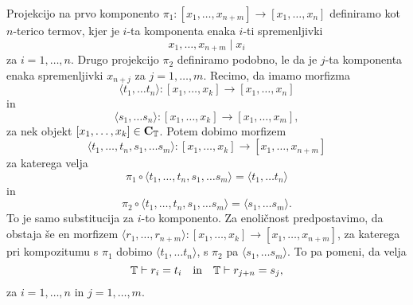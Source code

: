 \documentclass[../kategoricna_logika.tex]{subfiles}
\begin{document}
\begin{dokaz}
  Projekcijo na prvo komponento $\pi_1: [x_1, \ldots, x_{n+m}] \to [x_1, \ldots, x_n]$
  definiramo kot $n$-terico termov, kjer je $i$-ta komponenta enaka $i$-ti spremenljivki
  \[ x_1, \ldots, x_{n+m} \mid x_i\]
  za $i = 1, \ldots, n$. Drugo projekcijo $\pi_2$ definiramo podobno, le da je $j$-ta
  komponenta enaka spremenljivki $x_{n+j}$ za $j = 1, \ldots, m$. Recimo, da imamo morfizma
  \[\langle t_1, \ldots t_n \rangle: [x_1, \ldots, x_k] \to [x_1, \ldots, x_n]\]
  in
  \[\langle s_1, \ldots s_n \rangle: [x_1, \ldots, x_k] \to [x_1, \ldots, x_m],\]
  za nek objekt $[x_1, \ldots, x_k] \in {\operatorname{\mathbf{C}}}_{\mathbb{T}}$.
  Potem dobimo morfizem
  \[\langle t_1, \ldots, t_n, s_1, \ldots s_m \rangle: [x_1, \ldots, x_k] \to [x_1, \ldots, x_{n+m}]\]
  za katerega velja
  \[\pi_1 \circ \langle t_1, \ldots, t_n, s_1, \ldots s_m \rangle = \langle t_1, \ldots t_n \rangle\]
  in
  \[\pi_2 \circ \langle t_1, \ldots, t_n, s_1, \ldots s_m \rangle = \langle s_1, \ldots s_m \rangle.\]
  To je samo substitucija za $i$-to komponento.
  Za enoličnost predpostavimo, da obstaja še en morfizem
  $\langle r_1, \ldots, r_{n+m} \rangle :  [x_1, \ldots, x_k] \to [x_1, \ldots, x_{n+m}]$,
  za katerega pri kompozitumu s $\pi_1$ dobimo $\langle t_1, \ldots t_n \rangle$,
  s $\pi_2$ pa $\langle s_1, \ldots s_m \rangle$. To pa pomeni, da velja
  \[ \mathbb{T} \vdash r_i = t_i \quad \text{in} \quad  \mathbb{T} \vdash r_{j+n} = s_j,\]
  za  $i = 1, \ldots, n$ in $j = 1, \ldots, m$.
\end{dokaz}
%
%
\end{document}
